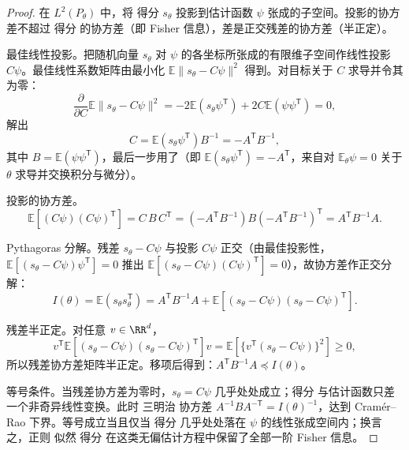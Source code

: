 \begin{proof}
在 $L^2(P_\theta)$ 中，将 得分 $s_\theta$ 投影到估计函数 $\psi$ 张成的子空间。投影的协方差不超过 得分 的协方差（即 Fisher 信息），差是正交残差的协方差（半正定）。

最佳线性投影。把随机向量 $s_\theta$ 对 $\psi$ 的各坐标所张成的有限维子空间作线性投影 $C\psi$。最佳线性系数矩阵由最小化 $\mathbb E\|s_\theta-C\psi\|^2$ 得到。对目标关于 $C$ 求导并令其为零：
\[
\frac{\partial}{\partial C}\mathbb E\|s_\theta-C\psi\|^2
=-2\mathbb E(s_\theta\psi^{\mathsf T})+2C\mathbb E(\psi\psi^{\mathsf T})=0,
\]
解出
\begin{equation*}
 C
 =\mathbb E(s_\theta\psi^{\mathsf T})
 B^{-1}
 =-A^{\mathsf T}B^{-1},
\end{equation*}
其中 $B=\mathbb E(\psi\psi^{\mathsf T})$，最后一步用了（即 $\mathbb E(s_\theta\psi^{\mathsf T})=-A^{\mathsf T}$，来自对 $\mathbb E_\theta\psi=0$ 关于 $\theta$ 求导并交换积分与微分）。

投影的协方差。
\begin{equation*}
 \mathbb E[(C\psi)(C\psi)^{\mathsf T}]
 =C\,B\,C^{\mathsf T}
 =(-A^{\mathsf T}B^{-1})B(-A^{\mathsf T}B^{-1})^{\mathsf T}
 =A^{\mathsf T}B^{-1}A.
\end{equation*}

Pythagoras 分解。残差 $s_\theta-C\psi$ 与投影 $C\psi$ 正交（由最佳投影性，$\mathbb E[(s_\theta-C\psi)\psi^{\mathsf T}]=0$ 推出 $\mathbb E[(s_\theta-C\psi)(C\psi)^{\mathsf T}]=0$），故协方差作正交分解：
\begin{equation*}
 I(\theta)
 =\mathbb E(s_\theta s_\theta^{\mathsf T})
 =A^{\mathsf T}B^{-1}A
 +\mathbb E[(s_\theta-C\psi)(s_\theta-C\psi)^{\mathsf T}].
\end{equation*}

残差半正定。对任意 $v\in\RR^d$，
\begin{equation*}
 v^{\mathsf T}
 \mathbb E[(s_\theta-C\psi)(s_\theta-C\psi)^{\mathsf T}]
 v
 =\mathbb E\!\left[\{v^{\mathsf T}(s_\theta-C\psi)\}^2\right]\ge0,
\end{equation*}
所以残差协方差矩阵半正定。移项后得到：$A^{\mathsf T}B^{-1}A\preceq I(\theta)$。

等号条件。当残差协方差为零时，$s_\theta=C\psi$ 几乎处处成立；得分 与估计函数只差一个非奇异线性变换。此时 三明治 协方差 $A^{-1}BA^{-\mathsf T}=I(\theta)^{-1}$，达到 Cramér--Rao 下界。等号成立当且仅当 得分 几乎处处落在 $\psi$ 的线性张成空间内；换言之，正则 似然 得分 在这类无偏估计方程中保留了全部一阶 Fisher 信息。
\end{proof}

